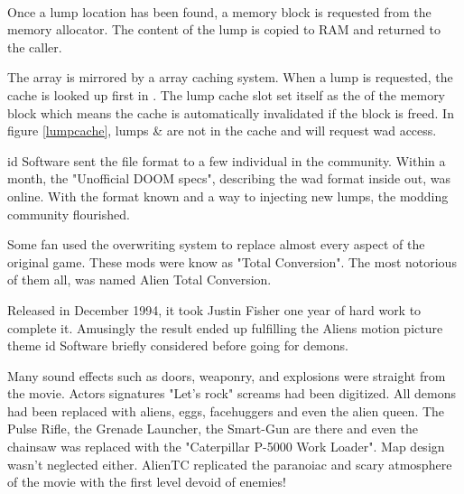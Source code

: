 \par
{}\\
\par
Once a lump location has been found, a memory block is requested from the memory allocator. The content of the lump is copied to RAM and returned to the caller. \\
\par
The  array is mirrored by a  array caching system. When a lump is requested, the cache is looked up first in . The lump cache slot set itself as the  of the memory block which means the cache is automatically invalidated if the block is freed. In figure \ref{lumpcache}, lumps  \&  are not in the cache and will request wad access.\\
\par
{}
\par
{}


id Software sent the file format to a few individual in the community. Within a month, the "Unofficial DOOM specs", describing the wad format inside out, was online. With the format known and a way to injecting new lumps, the modding community flourished.\\
\par

Some fan used the overwriting system to replace almost every aspect of the original game. These mods were know as "Total Conversion". The most notorious of them all, was named Alien Total Conversion.\\
\par
Released in December 1994, it took Justin Fisher one year of hard work to complete it. Amusingly the result ended up fulfilling the Aliens motion picture theme id Software briefly considered before going for demons.\\
\par
 \par
 Many sound effects such as doors, weaponry, and explosions were straight from the movie. Actors signatures "Let's rock" screams had been digitized. All demons had been replaced with aliens, eggs, facehuggers and even the alien queen. The Pulse Rifle, the Grenade Launcher, the Smart-Gun are there and even the chainsaw was replaced with the "Caterpillar P-5000 Work Loader". Map design wasn't neglected either. AlienTC replicated the paranoiac and scary atmosphere of the movie with the first level devoid of enemies!
